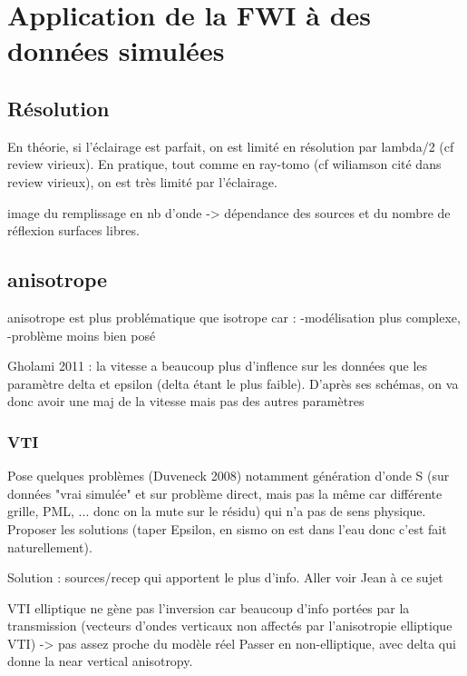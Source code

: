 \chapter{Application de la FWI à des données simulées}


\section{Résolution}
En théorie, si l'éclairage est parfait, on est limité en résolution par lambda/2 (cf review virieux). En pratique, tout comme en ray-tomo (cf wiliamson cité dans review virieux), on est très limité par l'éclairage.

image du remplissage en nb d'onde -> dépendance des sources et du nombre de réflexion surfaces libres.

\section{anisotrope}

anisotrope est plus problématique que isotrope car : 
-modélisation plus complexe,
-problème moins bien posé

Gholami 2011 : la vitesse a beaucoup plus d'inflence sur les données que les paramètre delta et epsilon (delta étant le plus faible). D'après ses schémas, on va donc avoir une maj de la vitesse mais pas des autres paramètres

\subsection{VTI}
Pose quelques problèmes (Duveneck 2008) notamment génération d'onde S (sur données "vrai simulée"  et sur problème direct, mais pas la même car différente grille, PML, ... donc on la mute sur le résidu) qui n'a pas de sens physique. Proposer les solutions (taper Epsilon, en sismo on est dans l'eau donc c'est fait naturellement).


Solution : sources/recep qui apportent le plus d'info. Aller voir Jean à ce sujet


VTI elliptique ne gène pas l'inversion car beaucoup d'info portées par la transmission (vecteurs d'ondes verticaux non affectés par l'anisotropie elliptique VTI)  -> pas assez proche du modèle réel
Passer en non-elliptique, avec delta qui donne la near vertical anisotropy.